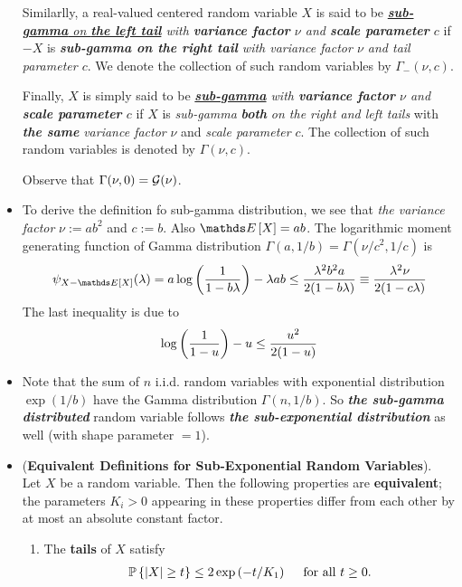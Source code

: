 \documentclass[11pt]{article}
\begin{document}
\begin{itemize}
\begin{definition}
Similarlly, a real-valued centered random variable $X$ is said to be \emph{\underline{\textbf{sub-gamma} on \textbf{the left tail}} with \textbf{variance factor} $\nu$ and \textbf{scale parameter} $c$} if $-X$ is \emph{\textbf{sub-gamma on the right tail} with variance factor $\nu$ and tail parameter $c$}. We denote the collection of such random variables by $\Gamma_{-}(\nu, c)$. 

Finally, $X$ is simply said to be \emph{\underline{\textbf{sub-gamma}} with \textbf{variance factor} $\nu$ and \textbf{scale parameter} $c$} if $X$ is \emph{sub-gamma} \emph{\textbf{both}} \emph{on the right and left tails} with \emph{\textbf{the same}} \emph{variance factor} $\nu$ and \emph{scale parameter} $c$. The collection of such random variables is denoted by  $\Gamma(\nu, c)$.

Observe that $\Gamma(\nu, 0)= {\mathcal G}(\nu)$.
\end{definition}

\item \begin{remark}
To derive the definition fo sub-gamma distribution, we see that \emph{the variance factor} $\nu:= ab^2$ and $c:= b$. Also $\E{}{X} = ab$. The logarithmic moment generating function of Gamma distribution $\Gamma(a, 1/b) = \Gamma(\nu/c^2, 1/c)$ is 
\begin{align*}
\psi_{X - \E{}{X}}(\lambda) = a\log\paren{\frac{1}{1 - b \lambda}} - \lambda a b  \le  \frac{\lambda^2 b^2 a}{2(1 - b\lambda)} \equiv  \frac{\lambda^2 \nu}{2(1 - c\lambda)}
\end{align*}
The last inequality is due to 
\begin{align*}
\log \left(\frac{1}{1 - u}\right) - u \le \frac{u^2}{2(1 - u)}
\end{align*}
\end{remark}

\item \begin{remark}
Note that the sum of $n$ i.i.d. random variables with exponential distribution $\exp(1/b)$ have the Gamma distribution $\Gamma(n, 1/b)$. So \emph{\textbf{the sub-gamma distributed}} random variable follows  \emph{\textbf{the sub-exponential distribution}} as well (with shape parameter $=1$).
\end{remark}

\item \begin{proposition} (\textbf{Equivalent Definitions for Sub-Exponential Random Variables}).  \citep{vershynin2018high}\\
Let $X$ be a random variable. Then the following properties are \textbf{equivalent}; the parameters $K_i > 0$ appearing in these
properties differ from each other by at most an absolute constant factor.
\begin{enumerate}
\item The \textbf{tails} of $X$ satisfy
\begin{align*}
{\mathbb P}\left\{\left\lvert X \right\rvert \ge t\right\} \le 2 \exp\left(-t/K_1\right)\quad\text{ for all }t \ge 0.
\end{align*}


\end{enumerate}
\end{proposition}
\end{itemize}
\end{document}
